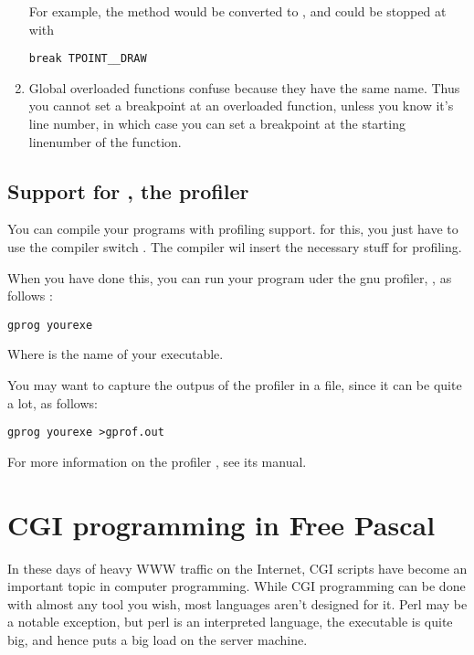 \documentclass{report}
\begin{document}
\begin{enumerate}
For example, the method  would be converted to
, and could be stopped at with
\begin{verbatim}
break TPOINT__DRAW
\end{verbatim}

\item Global overloaded functions confuse  because they have the same
name. Thus you cannot set a breakpoint at an overloaded function, unless you
know it's line number, in which case you can set a breakpoint at the
starting linenumber of the function.
\end{enumerate}

\section{Support for , the \gnu profiler}
\label{se:gprof}

You can compile your programs with profiling support. for this, you just
have to use the compiler switch . The compiler wil insert the
necessary stuff for profiling. 

When you have done this, you can run your program uder the gnu profiler,
, as follows :
\begin{verbatim}
gprog yourexe
\end{verbatim}
Where  is the name of your executable.

You may want to capture the outpus of the profiler in a file, since it can
be quite a lot, as follows:
\begin{verbatim}
gprog yourexe >gprof.out
\end{verbatim}

For more information on the \gnu profiler , see its manual.


\chapter{CGI programming in Free Pascal}
\label{ch:CGIProgramming}

In these days of heavy WWW traffic on the Internet, CGI scripts have become
an important topic in computer programming. While CGI programming can be
done with almost any tool you wish, most languages aren't designed for it.
Perl may be a notable exception, but perl is an interpreted language, the
executable is quite big, and hence puts a big load on the server machine.
\end{document}
